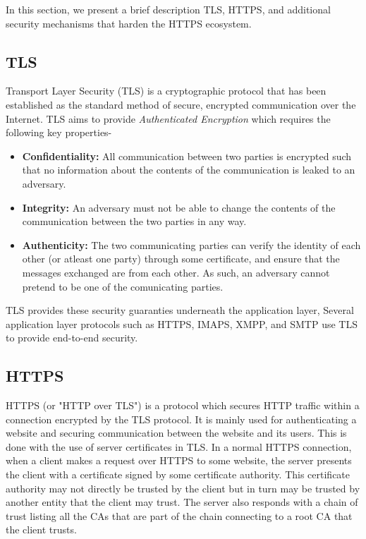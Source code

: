 In this section, we present a brief description TLS, HTTPS, and additional security
mechanisms that harden the HTTPS ecosystem.

\subsection{TLS}
Transport Layer Security (TLS) is a cryptographic protocol that has been
established as the standard method of secure, encrypted communication over the
Internet. TLS aims to provide \emph{Authenticated Encryption} which requires the
following key properties-
\begin{itemize}
  \item \textbf{Confidentiality:} All communication between two parties is
  encrypted such that no information about the contents of the communication is
  leaked to an adversary.

  \item \textbf{Integrity:} An adversary must not be able to change the
  contents of the communication between the two parties in any way.

  \item \textbf{Authenticity:} The two communicating parties can verify the
  identity of each other (or atleast one party) through some certificate, and
  ensure that the messages exchanged are from each other. As such, an adversary
  cannot pretend to be one of the comunicating parties.
\end{itemize}

TLS provides these security guaranties underneath the application layer,
Several application layer protocols such as HTTPS, IMAPS, XMPP, and SMTP use TLS
to provide end-to-end security.

\subsection{HTTPS}
HTTPS (or "HTTP over TLS") is a protocol which secures HTTP traffic within a
connection encrypted by the TLS protocol. It is mainly used for authenticating
a website and securing communication between the website and its users. This is
done with the use of server certificates in TLS. In a normal HTTPS connection,
when a client makes a request over HTTPS to some website, the server presents
the client with a certificate signed by some certificate authority. This certificate
authority may not directly be trusted by the client but in turn may be trusted by
another entity that the client may trust. The server also responds with a chain of
trust listing all the CAs that are part of the chain connecting to a root CA that
the client trusts.

